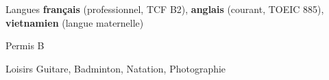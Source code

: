 

\begin{cvskills}
    

 \cvskill
    {Langues} %
    {\textbf{français} (professionnel, TCF B2), \textbf{anglais} (courant, TOEIC 885), \textbf{vietnamien} (langue maternelle)} %

  \cvskill
    {Permis} %
    {B} %
    
  \cvskill
    {Loisirs} %
    {Guitare, Badminton, Natation, Photographie} %
    
\end{cvskills}

